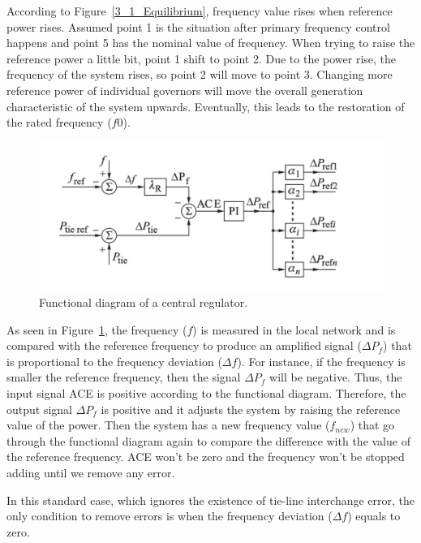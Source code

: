 According to Figure~\ref{3_1_Equilibrium}, frequency value rises when reference power rises. Assumed point 1 is the situation after primary frequency control happens and point 5 has the nominal value of frequency. When trying to raise the reference power a little bit, point 1 shift to point 2. Due to the power rise, the frequency of the system rises, so point 2 will move to point 3. Changing more reference power of individual governors will move the overall generation characteristic of the system upwards. Eventually, this leads to the restoration of the rated frequency ($f0$). 

\begin{figure}[t]
\center
\includegraphics[scale=0.42]{figure/3_1_Functional.png}
\caption{Functional diagram of a central regulator.}
\label{3_1_Functional}
\end{figure}

As seen in Figure~\ref{3_1_Functional}, the frequency ($f$) is measured in the local network and is compared with the reference frequency to produce an amplified signal ($\Delta P_f$) that is proportional to the frequency deviation ($\Delta f$). For instance, if the frequency is smaller the reference frequency, then the signal $\Delta P_f$ will be negative. Thus, the input signal ACE is positive according to the functional diagram. Therefore, the output signal $\Delta P_f$ is positive and it adjusts the system by raising the reference value of the power. Then the system has a new frequency value ($f_{n e w}$) that go through the functional diagram again to compare the difference with the value of the reference frequency. ACE won’t be zero and the frequency won’t be stopped adding until we remove any error. 

In this standard case, which ignores the existence of tie-line interchange error, the only condition to remove errors is when the frequency deviation ($\Delta f$) equals to zero. 

